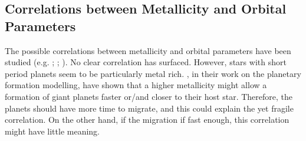 \documentclass[dvips,12pt,a4paper]{report}
\begin{document}
{\subsection {Correlations between Metallicity and Orbital Parameters}

The possible correlations between metallicity and orbital parameters have been studied (e.g. \citeauthor{Gonzalez-1998} \citeyear{Gonzalez-1998}; \citeauthor{Santos-2003} \citeyear{Santos-2003}; \citeauthor {Fischer-2005} \citeyear {Fischer-2005}). No clear correlation has surfaced. However, stars with short period planets seem to be particularly metal rich. \citet{Ida-2004b}, in their work on the planetary formation modelling, have shown that a higher metallicity might allow a formation of giant planets faster or/and closer to their host star. Therefore, the planets should have more time to migrate, and this could explain the yet fragile correlation.  On the other hand, if the migration if fast enough, this correlation might have little meaning. %






}
\end{document}
